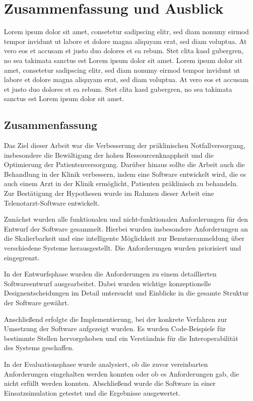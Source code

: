 \chapter{Zusammenfassung und Ausblick}
Lorem ipsum dolor sit amet, consetetur sadipscing
elitr, sed diam nonumy eirmod tempor invidunt ut labore
et dolore magna aliquyam erat, sed diam voluptua. At vero eos et
accusam et justo duo dolores et ea rebum. Stet clita kasd gubergren, 
no sea takimata sanctus est Lorem ipsum dolor sit amet. Lorem ipsum dolor 
sit amet, consetetur sadipscing elitr, sed diam nonumy eirmod tempor 
invidunt ut labore et dolore magna aliquyam erat, sed diam voluptua. 
At vero eos et accusam et justo duo dolores et ea rebum. Stet clita kasd 
gubergren, no sea takimata sanctus est Lorem ipsum dolor sit amet.

\section{Zusammenfassung}

Das Ziel dieser Arbeit war die Verbesserung der präklinischen Notfallversorgung, insbesondere die Bewältigung der hohen Ressourcenknappheit und die Optimierung der Patientenversorgung. Darüber hinaus sollte die Arbeit auch die Behandlung in der Klinik verbessern, indem eine Software entwickelt wird, die es auch einem Arzt in der Klinik ermöglicht, Patienten präklinisch zu behandeln. Zur Bestätigung der Hypothesen wurde im Rahmen dieser Arbeit eine Telenotarzt-Software entwickelt.

Zunächst wurden alle funktionalen und nicht-funktionalen Anforderungen für den Entwurf der Software gesammelt. Hierbei wurden insbesondere Anforderungen an die Skalierbarkeit und eine intelligente Möglichkeit zur Benutzeranmeldung über verschiedene Systeme herausgestellt. Die Anforderungen wurden priorisiert und eingegrenzt.

In der Entwurfsphase wurden die Anforderungen zu einem detaillierten Softwareentwurf ausgearbeitet. Dabei wurden wichtige konzeptionelle Designentscheidungen im Detail untersucht und Einblicke in die gesamte Struktur der Software gewährt.

Anschließend erfolgte die Implementierung, bei der konkrete Verfahren zur Umsetzung der Software aufgezeigt wurden. Es wurden Code-Beispiele für bestimmte Stellen hervorgehoben und ein Verständnis für die Interoperabilität des Systems geschaffen.

In der Evaluationsphase wurde analysiert, ob die zuvor vereinbarten Anforderungen eingehalten werden konnten oder ob es Anforderungen gab, die nicht erfüllt werden konnten. Abschließend wurde die Software in einer Einsatzsimulation getestet und die Ergebnisse ausgewertet.

